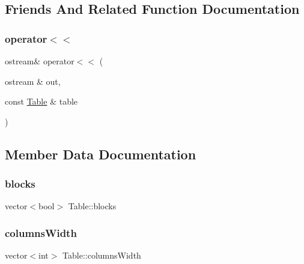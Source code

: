 \subsection{Friends And Related Function Documentation}
\hypertarget{class_table_af5e0f2c2e64aa1dc084c36859c54a289}{}\label{class_table_af5e0f2c2e64aa1dc084c36859c54a289} 
\subsubsection{\texorpdfstring{operator$<$$<$}{operator<<}}
{\footnotesize\ttfamily ostream\& operator$<$$<$ (\begin{DoxyParamCaption}\item[{ostream \&}]{out,  }\item[{const \hyperlink{class_table}{Table} \&}]{table }\end{DoxyParamCaption})\hspace{0.3cm}{\ttfamily [friend]}}



\subsection{Member Data Documentation}
\hypertarget{class_table_a733288d34b5fd55085572f212fbe0260}{}\label{class_table_a733288d34b5fd55085572f212fbe0260} 
\subsubsection{\texorpdfstring{blocks}{blocks}}
{\footnotesize\ttfamily vector$<$bool$>$ Table\+::blocks\hspace{0.3cm}{\ttfamily [private]}}

\hypertarget{class_table_a36e32fdefca7b32f938d0029496c4238}{}\label{class_table_a36e32fdefca7b32f938d0029496c4238} 
\subsubsection{\texorpdfstring{columns\+Width}{columnsWidth}}
{\footnotesize\ttfamily vector$<$int$>$ Table\+::columns\+Width\hspace{0.3cm}{\ttfamily [private]}}

\hypertarget{class_table_a4e5eecbb3e6363585df871429381f433}{}\label{class_table_a4e5eecbb3e6363585df871429381f433} 
